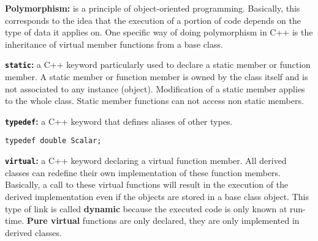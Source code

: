 \begin{list}{}{}
 \item[\textbf{Polymorphism:}] is a principle of object-oriented programming. Basically, this corresponds to the idea that the execution of a portion of code depends on the type of data it applies on. One specific way of doing polymorphism in C++ is the inheritance of virtual member functions from a base class.


 \item[\textbf{\texttt{static}:}] a C++ keyword particularly used to declare a static member or function member. A static member or function member is owned by the class itself and is not associated to any instance (object). Modification of a static member applies to the whole class. Static member functions can not access non static members.


 \item[\textbf{\texttt{typedef}:}] a C++ keyword that defines aliases of other types.
\begin{verbatim}
typedef double Scalar;
\end{verbatim}


 \item[\textbf{\texttt{virtual}:}] a C++ keyword declaring a virtual function member. All derived classes can redefine their own implementation of these function members. Basically, a call to these virtual functions will result in the execution of the derived implementation even if the objects are stored in a base class object. This type of link is called \textbf{dynamic} because the executed code is only known at run-time. \textbf{Pure virtual} functions are only declared, they are only implemented in derived classes.

\end{list}
